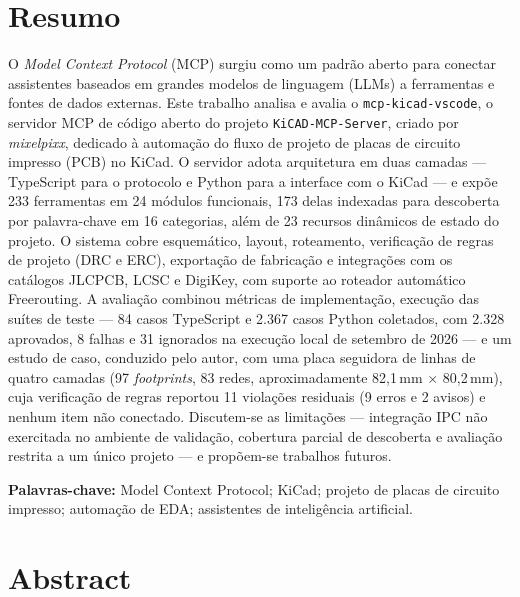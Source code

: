 \chapter*{Resumo}

\noindent
O \emph{Model Context Protocol} (MCP) surgiu como um padrão aberto para
conectar assistentes baseados em grandes modelos de linguagem (LLMs) a
ferramentas e fontes de dados externas. Este trabalho analisa e avalia o
\texttt{mcp-kicad-vscode}, o servidor MCP de código aberto do projeto
\texttt{KiCAD-MCP-Server}, criado por \emph{mixelpixx}, dedicado à automação
do fluxo de projeto de placas de circuito impresso (PCB) no KiCad. O servidor
adota arquitetura em duas camadas --- TypeScript para o protocolo e Python
para a interface com o KiCad --- e expõe 233 ferramentas em 24 módulos
funcionais, 173 delas indexadas para descoberta por palavra-chave em 16
categorias, além de 23 recursos dinâmicos de estado do projeto. O sistema
cobre esquemático, layout, roteamento, verificação de regras de projeto (DRC e
ERC), exportação de fabricação e integrações com os catálogos JLCPCB, LCSC e
DigiKey, com suporte ao roteador automático Freerouting. A avaliação combinou
métricas de implementação, execução das suítes de teste --- 84 casos
TypeScript e 2.367 casos Python coletados, com 2.328 aprovados, 8 falhas e 31
ignorados na execução local de setembro de 2026 --- e um estudo de caso,
conduzido pelo autor, com uma placa seguidora de linhas de quatro camadas (97
\emph{footprints}, 83 redes, aproximadamente 82,1\,mm $\times$ 80,2\,mm), cuja
verificação de regras reportou 11 violações residuais (9 erros e 2 avisos) e
nenhum item não conectado. Discutem-se as limitações --- integração IPC não exercitada no
ambiente de validação, cobertura parcial de descoberta e avaliação restrita a
um único projeto --- e propõem-se trabalhos futuros.

\vspace{\baselineskip}
\noindent\textbf{Palavras-chave:} Model Context Protocol; KiCad; projeto de
placas de circuito impresso; automação de EDA; assistentes de inteligência
artificial.

\chapter*{Abstract}


